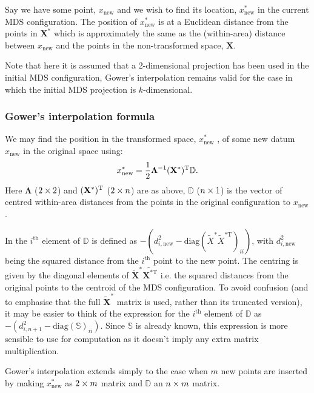 Say we have some point, $x_{\text{new}}$ and we wish to find its location, $x^*_{\text{new}}$ in the current MDS configuration. The position of $x^*_{\text{new}}$ is at a Euclidean distance from the points in $\mathbf{X}^*$ which is approximately the same as the (within-area) distance between $x_{\text{new}}$ and the points in the non-transformed space, $\mathbf{X}$. 

Note that here it is assumed that a 2-dimensional projection has been used in the initial MDS configuration, Gower's interpolation remains valid for the case in which the initial MDS projection is $k$-dimensional.

\subsubsection{Gower's interpolation formula}

We may find the position in the transformed space, $x^*_{\text{new}}$ , of some new datum $x_{\text{new}}$ in the original space using:
\begin{equation}
x^*_{\text{new}} = \frac{1}{2} \mathbf{\Lambda}^{-1} (\mathbf{X}^*)^{\text{T}} \mathbb{D}.
\label{gower}
\end{equation}
Here $\mathbf{\Lambda}$ ($2 \times 2$) and $(\mathbf{X}^*)^{\text{T}}$ ($2 \times n$) are as above, $\mathbb{D}$ ($n \times 1$) is the vector of centred within-area distances from the points in the original configuration to $x_{\text{new}}$.

In  the $i^\text{th}$ element of $\mathbb{D}$ is defined as $-(d^2_{i,\text{new}}-\text{diag}(\tilde{X}^* \tilde{X}^{*\text{T}})_{ii})$, with $d^2_{i,\text{new}}$ being the squared distance from the $i^\text{th}$ point to the new point. The centring is given by the diagonal elements of $\tilde{\mathbf{X}}^*\tilde{\mathbf{X}^{* \text{T}}}$ i.e. the squared distances from the original points to the centroid of the MDS configuration. To avoid confusion (and to emphasise that the full $\tilde{\mathbf{X}}^*$ matrix is used, rather than its truncated version), it may be easier to think of the expression for the $i^\text{th}$ element of $\mathbb{D}$ as $-(d^2_{i,n+1}-\text{diag}(\mathbb{S})_{ii})$. Since $\mathbb{S}$ is already known, this expression is more sensible to use for computation as it doesn't imply any extra matrix multiplication.

Gower's interpolation extends simply to the case when $m$ new points are inserted by making $x^*_{\text{new}}$ as $2 \times m$ matrix and $\mathbb{D}$ an $n \times m$ matrix.


